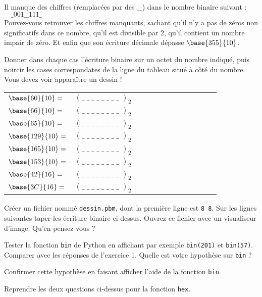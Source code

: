 \documentclass[11pt,a4paper]{article}
\begin{document}
 \\
Il manque des chiffres (remplacées par des \_) dans le nombre binaire suivant : $\quad \_001\_\_111\_$ \\
Pouvez-vous retrouver les chiffres manquants, sachant qu'il n'y a pas de zéros non significatifs dans ce nombre, qu'il est divisible par 2, qu'il contient un nombre impair de zéro. Et enfin que son écriture décimale dépasse $\base{355}{10}$.
\vspace{0.2cm}

\QListe
\item Donner dans chaque cas l'écriture binaire sur un octet du nombre indiqué, puis noircir les cases correspondates de la ligne du tableau situé à côté du nombre. Vous devez voir apparaître un dessin !\
\begin{tabularx}{0.64\textwidth}{p{1.3cm}X|p{0.2cm}|p{0.2cm}|p{0.2cm}|p{0.2cm}|p{0.2cm}|p{0.2cm}|p{0.2cm}|p{0.2cm}|}
\cline{3-10}
$\base{60}{10}=$ & $\left( \_\;\_\;\_\;\_\;\_\;\_\;\_\;\_\; \right)_{2} \qquad $ &  & & & & & & & \\
\cline{3-10}
$\base{66}{10}=$ & $\left( \_\;\_\;\_\;\_\;\_\;\_\;\_\;\_\; \right)_{2} \qquad $ &  & & & & & & & \\
\cline{3-10}
$\base{65}{10}=$ & $\left( \_\;\_\;\_\;\_\;\_\;\_\;\_\;\_\; \right)_{2} \qquad $ &  & & & & & & & \\
\cline{3-10}
$\base{129}{10}=$ & $\left( \_\;\_\;\_\;\_\;\_\;\_\;\_\;\_\; \right)_{2} \qquad $ &  & & & & & & & \\
\cline{3-10}
$\base{165}{10}=$ & $\left( \_\;\_\;\_\;\_\;\_\;\_\;\_\;\_\; \right)_{2} \qquad $ &  & & & & & & & \\
\cline{3-10}
$\base{153}{10}=$ & $\left( \_\;\_\;\_\;\_\;\_\;\_\;\_\;\_\; \right)_{2} \qquad $ &  & & & & & & & \\
\cline{3-10}
$\base{42}{16}=$ & $\left( \_\;\_\;\_\;\_\;\_\;\_\;\_\;\_\; \right)_{2} \qquad $ &  & & & & & & & \\
\cline{3-10}
$\base{3C}{16}=$ & $\left( \_\;\_\;\_\;\_\;\_\;\_\;\_\;\_\; \right)_{2} \qquad $ &  & & & & & & & \\
\cline{3-10}
\end{tabularx}
\item  Créer un fichier nommé \texttt{dessin.pbm}, dont la première ligne est \texttt{8 8}. Sur les lignes suivantes taper les écriture binaire ci-dessus. Ouvrez ce fichier avec un visualiseur d'image. Qu'en pensez-vous ?
\FinListe
\vspace{0.2cm}


\QListe
\item Tester la fonction \texttt{bin} de Python en affichant par exemple \texttt{bin(201)} et \texttt{bin(57)}. Comparer avec les réponses de l'exercice 1. Quelle est votre hypothèse sur \texttt{bin} ?
\item Confirmer cette hypothèse en faisant afficher l'aide de la fonction \texttt{bin}.
\item Reprendre les deux questions ci-dessus pour la fonction \texttt{hex}.
\FinListe
\vspace{0.2cm}
\end{document}
